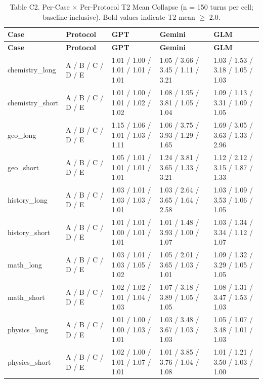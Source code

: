 \documentclass[manuscript, screen, review]{jair}
\begin{document}
{\small
\begin{longtable}{@{}p{.18\linewidth}p{.16\linewidth}p{.20\linewidth}p{.20\linewidth}p{.20\linewidth}@{}}
\caption{Table C2. Per-Case $\times$ Per-Protocol T2 Mean Collapse (n = 150 turns per cell; baseline-inclusive). Bold values indicate T2 mean $\geq$ 2.0.}
\label{tab:heatmap-t2}
\\
\toprule
\textbf{Case} & \textbf{Protocol} & \textbf{GPT} & \textbf{Gemini} & \textbf{GLM} \\
\midrule
\endfirsthead
\toprule
\textbf{Case} & \textbf{Protocol} & \textbf{GPT} & \textbf{Gemini} & \textbf{GLM} \\
\midrule
\endhead
chemistry\_long & A / B / C / D / E & 1.01 / 1.00 / 1.01 / 1.01 / 1.01 & 1.05 / 3.66 / 3.45 / 1.11 / 3.21 & 1.03 / 1.53 / 3.18 / 1.05 / 1.03 \\
chemistry\_short & A / B / C / D / E & 1.01 / 1.00 / 1.01 / 1.02 / 1.02 & 1.08 / 1.95 / 3.81 / 1.05 / 1.04 & 1.09 / 1.13 / 3.31 / 1.09 / 1.05 \\
geo\_long & A / B / C / D / E & 1.15 / 1.06 / 1.01 / 1.03 / 1.11 & 1.06 / 3.75 / 3.93 / 1.29 / 1.65 & 1.69 / 3.05 / 3.63 / 1.33 / 2.96 \\
geo\_short & A / B / C / D / E & 1.05 / 1.01 / 1.01 / 1.01 / 1.01 & 1.24 / 3.81 / 3.65 / 1.33 / 3.21 & 1.12 / 2.12 / 3.15 / 1.87 / 1.33 \\
history\_long & A / B / C / D / E & 1.03 / 1.01 / 1.03 / 1.03 / 1.01 & 1.03 / 2.64 / 3.65 / 1.64 / 2.58 & 1.03 / 1.09 / 3.53 / 1.06 / 1.05 \\
history\_short & A / B / C / D / E & 1.01 / 1.01 / 1.00 / 1.01 / 1.01 & 1.01 / 1.48 / 3.93 / 1.00 / 1.07 & 1.03 / 1.34 / 3.34 / 1.12 / 1.07 \\
math\_long & A / B / C / D / E & 1.03 / 1.01 / 1.03 / 1.05 / 1.02 & 1.05 / 2.01 / 3.65 / 1.03 / 1.01 & 1.09 / 1.32 / 3.29 / 1.05 / 1.05 \\
math\_short & A / B / C / D / E & 1.02 / 1.02 / 1.01 / 1.04 / 1.03 & 1.07 / 3.18 / 3.89 / 1.05 / 1.05 & 1.08 / 1.31 / 3.47 / 1.53 / 1.03 \\
physics\_long & A / B / C / D / E & 1.01 / 1.00 / 1.00 / 1.03 / 1.01 & 1.03 / 3.48 / 3.67 / 1.03 / 1.03 & 1.05 / 1.07 / 3.48 / 1.01 / 1.03 \\
physics\_short & A / B / C / D / E & 1.02 / 1.00 / 1.01 / 1.07 / 1.01 & 1.01 / 3.85 / 3.76 / 1.04 / 1.08 & 1.01 / 1.21 / 3.50 / 1.03 / 1.00 \\
\bottomrule
\end{longtable}
}
\end{document}
